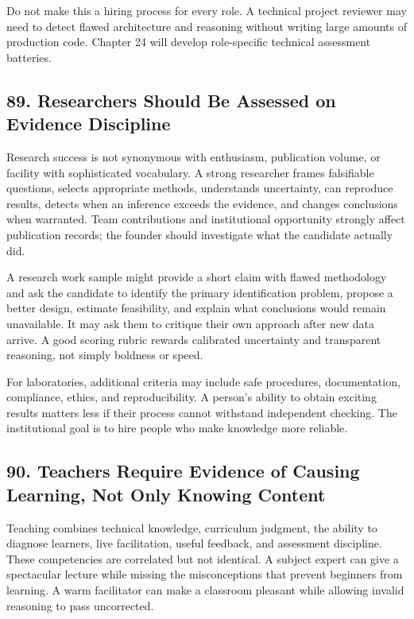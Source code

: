 Do not make this a hiring process for every role. A technical project reviewer may need to detect flawed architecture and reasoning without writing large amounts of production code. Chapter 24 will develop role-specific technical assessment batteries.

\subsection*{89. Researchers Should Be Assessed on Evidence Discipline}

Research success is not synonymous with enthusiasm, publication volume, or facility with sophisticated vocabulary. A strong researcher frames falsifiable questions, selects appropriate methods, understands uncertainty, can reproduce results, detects when an inference exceeds the evidence, and changes conclusions when warranted. Team contributions and institutional opportunity strongly affect publication records; the founder should investigate what the candidate actually did.

A research work sample might provide a short claim with flawed methodology and ask the candidate to identify the primary identification problem, propose a better design, estimate feasibility, and explain what conclusions would remain unavailable. It may ask them to critique their own approach after new data arrive. A good scoring rubric rewards calibrated uncertainty and transparent reasoning, not simply boldness or speed.

For laboratories, additional criteria may include safe procedures, documentation, compliance, ethics, and reproducibility. A person's ability to obtain exciting results matters less if their process cannot withstand independent checking. The institutional goal is to hire people who make knowledge more reliable.

\subsection*{90. Teachers Require Evidence of Causing Learning, Not Only Knowing Content}

Teaching combines technical knowledge, curriculum judgment, the ability to diagnose learners, live facilitation, useful feedback, and assessment discipline. These competencies are correlated but not identical. A subject expert can give a spectacular lecture while missing the misconceptions that prevent beginners from learning. A warm facilitator can make a classroom pleasant while allowing invalid reasoning to pass uncorrected.

